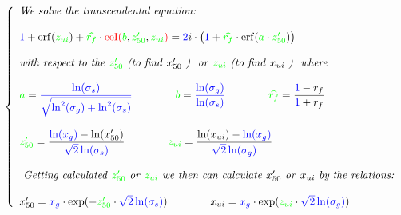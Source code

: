 \documentclass[12pt,reqno,intlimits,twoside]{amsart}
\DeclareMathOperator{\erf}{erf}%
\DeclareMathOperator{\eeI}{eeI}%
\begin{document}
\begin{equation}\label{EqXuiXred50Rf}  %
   \left\{
   \begin{array}{l}
      \text{\emph{We solve the transcendental equation:}}\\
      \phantom{\strut}\\
      \textcolor{blue}{1} +
      \erf(\textcolor{green}{z_{ui}}) +
      \textcolor{green}{\widehat{r_f}}\cdot
      \textcolor{red}{\eeI(}\textcolor{green}{b}, \textcolor{green}{z'_{50}}, \textcolor{green}{z_{ui}}
      \textcolor{red}{)} =
      \textcolor{blue}{2}i\cdot
      \big(\textcolor{blue}{1} +
           \textcolor{green}{\widehat{r_f}}\cdot
           \erf(\textcolor{green}{a}\cdot \textcolor{green}{z'_{50}})
      \big)\\
      \phantom{\strut}\\
      \text{\emph{with respect to the }} \textcolor{green}{z'_{50}}
      \text{\emph{ (to find }} x'_{50} \text{\emph{ ) }}
      \text{\emph{ or }}
      \textcolor{green}{z_{ui}}
      \text{\emph{ (to find }} x_{ui} \text{\emph{ ) }}
      \text{\emph{ where}}\\
      \phantom{\strut}\\
      \textcolor{green}{a} =
      \textcolor{blue}{\dfrac{\ln(\sigma_s)}{\sqrt{\ln^2(\sigma_g) + \ln^2(\sigma_s)}}}\qquad\qquad
      \textcolor{green}{b} =
      \textcolor{blue}{\dfrac{\ln(\sigma_g)}{\ln(\sigma_s)}}\qquad\qquad
      \textcolor{green}{\widehat{r_f}} =
      \dfrac{\textcolor{blue}{1} - r_f}{\textcolor{blue}{1} + r_f}\\
      \phantom{\strut}\\
      \textcolor{green}{z'_{50}} =
      \dfrac{\textcolor{blue}{\ln(x_g)} - \ln(x'_{50})}{\textcolor{blue}{\sqrt{2}\ln(\sigma_s)}}\qquad\qquad
      \textcolor{green}{z_{ui}} =
      \dfrac{\ln(x_{ui}) - \textcolor{blue}{\ln(x_g)}}{\textcolor{blue}{\sqrt{2}\ln(\sigma_g)}}\\
      \phantom{\strut}\\
      \text{\emph{ Getting calculated }} \textcolor{green}{z'_{50}}
      \text{\emph{ or }} \textcolor{green}{z_{ui}}
      \text{\emph{ we then can calculate }} x'_{50}
      \text{\emph{ or  }} x_{ui}
      \text{\emph{ by the relations: }}\\
      \phantom{\strut}\\
      x'_{50} = \textcolor{blue}{x_g}\cdot\exp(-\textcolor{green}{z'_{50}} \cdot \textcolor{blue}{\sqrt{2}\ln(\sigma_s)})
      \qquad\qquad
      x_{ui} = \textcolor{blue}{x_g}\cdot\exp(\textcolor{green}{z_{ui}} \cdot \textcolor{blue}{\sqrt{2}\ln(\sigma_g)})
      \end{array}
   \right.
\end{equation}
\end{document}
